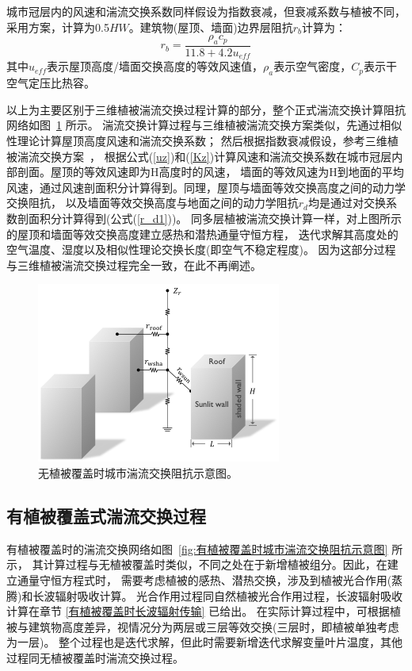 城市冠层内的风速和湍流交换系数同样假设为指数衰减，但衰减系数与植被不同，
采用\citet{masson2000physically}方案，计算为0.5$HW$。建筑物(屋顶、墙面)边界层阻抗$r_b$计算为\citep{oleson2008urban}：
\begin{equation}
r_{b}=\frac{\rho_{a} c_{p}}{11.8+4.2 u_{e f f}}
\end{equation}
其中$u_{eff}$表示屋顶高度/墙面交换高度的等效风速值，$\rho_a$表示空气密度，$C_p$表示干空气定压比热容。

以上为主要区别于三维植被湍流交换过程计算的部分，整个正式湍流交换计算阻抗网络如图~\ref{fig:无植被覆盖时城市湍流交换阻抗示意图} 所示。
湍流交换计算过程与三维植被湍流交换方案类似，先通过相似性理论计算屋顶高度风速和湍流交换系数；
然后根据指数衰减假设，参考三维植被湍流交换方案~\citep{dai2019different}，
根据公式(\ref{uz})和(\ref{Kz})计算风速和湍流交换系数在城市冠层内部剖面。屋顶的等效风速即为H高度时的风速，
墙面的等效风速为H到地面的平均风速，通过风速剖面积分计算得到。同理，屋顶与墙面等效交换高度之间的动力学交换阻抗，
以及墙面等效交换高度与地面之间的动力学阻抗$r_d$均是通过对交换系数剖面积分计算得到(公式(\ref{r_d1}))。
同多层植被湍流交换计算一样，对上图所示的屋顶和墙面等效交换高度建立感热和潜热通量守恒方程，
迭代求解其高度处的空气温度、湿度以及相似性理论交换长度(即空气不稳定程度)。
因为这部分过程与三维植被湍流交换过程完全一致，在此不再阐述。
{
\begin{figure}[htbp]
\centering
\includegraphics{Figures/城市模式/无植被覆盖时城市湍流交换阻抗示意图.png}
\caption{无植被覆盖时城市湍流交换阻抗示意图。}
\label{fig:无植被覆盖时城市湍流交换阻抗示意图}
\end{figure}
}


\subsection{有植被覆盖式湍流交换过程}
有植被覆盖时的湍流交换网络如图~\ref{fig:有植被覆盖时城市湍流交换阻抗示意图} 所示，
其计算过程与无植被覆盖时类似，不同之处在于新增植被组分。因此，在建立通量守恒方程式时，
需要考虑植被的感热、潜热交换，涉及到植被光合作用(蒸腾)和长波辐射吸收计算。
光合作用过程同自然植被光合作用过程，长波辐射吸收计算在章节 \ref{有植被覆盖时长波辐射传输} 已给出。
在实际计算过程中，可根据植被与建筑物高度差异，视情况分为两层或三层等效交换(三层时，即植被单独考虑为一层)。
整个过程也是迭代求解，但此时需要新增迭代求解变量叶片温度，其他过程同无植被覆盖时湍流交换过程。

